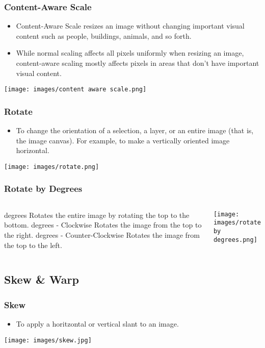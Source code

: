\documentclass{beamer}
\begin{document}
\begin{frame}
	\frametitle{Content-Aware Scale}
	\begin{itemize}
		\item Content-Aware Scale resizes an image without changing important visual content such as people, buildings, animals, and so forth.
		\item While normal scaling affects all pixels uniformly when resizing an image, content-aware scaling mostly affects pixels in areas that don’t have important visual content.
	\end{itemize}
	\begin{center}
		\texttt{[image: images/content aware scale.png]}
	\end{center}
\end{frame}

\begin{frame}
	\frametitle{Rotate}
	\begin{itemize}
		\item To change the orientation of a selection, a layer, or an entire image (that is, the image canvas). For example, to make a vertically oriented image horizontal.
\end{itemize}
\begin{center}
	\texttt{[image: images/rotate.png]}
	\end{center}
\end{frame}

\begin{frame}
	\frametitle{Rotate by Degrees}
		\begin{columns}
		\vspace{-25pt}
	\begin{outline}
		 degrees
		\2 Rotates the entire image by rotating the top to the bottom.
		 degrees - Clockwise
		\2 Rotates the image from the top to the right.
		 degrees - Counter-Clockwise
		\2 Rotates the image from the top to the left.
\end{outline}
		\texttt{[image: images/rotate by degrees.png]}
	\end{columns}
\end{frame}

		\subsection{Skew \& Warp}
\begin{frame}
	\frametitle{Skew}
	\begin{itemize}
		\item To apply a horitzontal or vertical slant to an image.
	\end{itemize}
	\begin{center}
		\texttt{[image: images/skew.jpg]}
	\end{center}
\end{frame}
\end{document}
